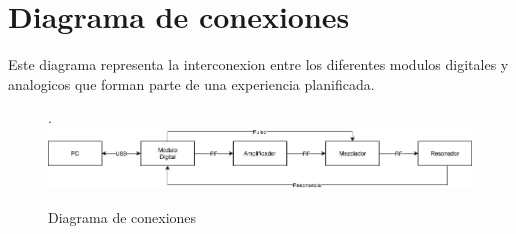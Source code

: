 \section{Diagrama de conexiones}

Este diagrama representa la interconexion entre los diferentes modulos digitales y analogicos que forman
parte de una experiencia planificada.

\begin{figure}[!htb].
    \includegraphics[width=\linewidth]{../figures/d4.jpg}
    \caption{Diagrama de conexiones}
    \label{fig:d1}
\end{figure}
  
\newpage
